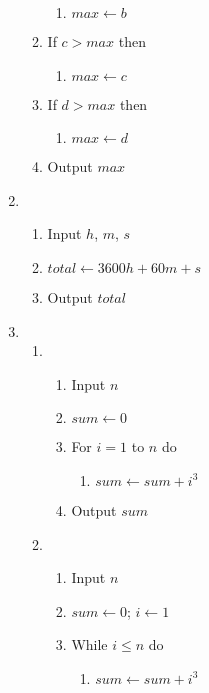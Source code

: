 \begin{enumerate}[leftmargin=2cm,labelsep=.5cm,label=\bf\arabic*.]
\begin{enumerate}[label=\arabic*.]
\begin{enumerate}[leftmargin=1cm,label*=\arabic*]
      \item $max\leftarrow b$
  \end{enumerate}
  \item If $c > max$ then
  \begin{enumerate}[leftmargin=1cm,label*=\arabic*]
      \item $max\leftarrow c$
  \end{enumerate}
  \item If $d > max$ then
  \begin{enumerate}[leftmargin=1cm,label*=\arabic*]
      \item $max\leftarrow d$
  \end{enumerate}
  \item Output $max$\\[1cm]
\end{enumerate}
\item
\begin{enumerate}[label=\arabic*.]
  \item Input $h$, $m$, $s$
  \item $total\leftarrow 3600h + 60m + s$ 
  \item Output $total$\\[1cm]
\end{enumerate}
\newpage
\item 
\begin{enumerate}
  \item
  \begin{enumerate}[label=\arabic*.]
    \item Input $n$
    \item $sum\leftarrow 0$
    \item For $i = 1$ to $n$ do
    \begin{enumerate}[leftmargin=1cm,label*=\arabic*]
      \item $sum\leftarrow sum + i^3$
    \end{enumerate}
    \item Output $sum$\\[5mm]
  \end{enumerate}
  \item
  \begin{enumerate}[label=\arabic*.]
    \item Input $n$
    \item $sum\leftarrow 0$; $i\leftarrow 1$
    \item While $i \leq n$ do
    \begin{enumerate}[leftmargin=1cm,label*=\arabic*]
      \item $sum\leftarrow sum + i^3$

\end{enumerate}
\end{enumerate}
\end{enumerate}
\end{enumerate}
